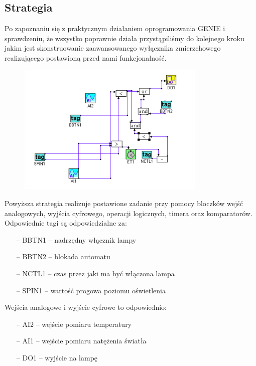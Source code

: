 \documentclass[a4paper, 12pt]{article}
\begin{document}
		\subsection{Strategia}
			Po zapoznaniu się z praktycznym działaniem oprogramowania GENIE i sprawdzeniu, że wszystko poprawnie działa przystąpiliśmy do kolejnego kroku jakim jest skonstruowanie zaawansowanego wyłącznika zmierzchowego realizującego postawioną przed nami funkcjonalność. 
			\begin{figure}[H]
				\centering
				\includegraphics[width = 0.8\textwidth]{./img/schemat.png}
			\end{figure}
			\noindent Powyższa strategia realizuje postawione zadanie przy pomocy bloczków wejść analogowych, wyjścia cyfrowego, operacji logicznych, timera oraz komparatorów. Odpowiednie tagi są odpowiedzialne za:
			\begin{itemize}
				\item[--] BBTN1 -- nadrzędny włącznik lampy
				\item[--] BBTN2 -- blokada automatu
				\item[--] NCTL1 -- czas przez jaki ma być włączona lampa
				\item[--] SPIN1 -- wartość progowa poziomu oświetlenia
			\end{itemize}
			Wejścia analogowe i wyjście cyfrowe to odpowiednio:
			\begin{itemize}
				\item[--] AI2 -- wejście pomiaru temperatury
				\item[--] AI1 -- wejście pomiaru natężenia światła
				\item[--] DO1 -- wyjście na lampę
			\end{itemize}
\end{document}
